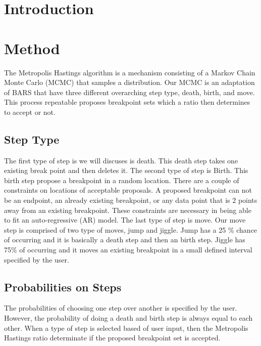 \documentclass[submit]{smj}
\begin{document}
\maketitle


\section{Introduction}

\section{Method}
The Metropolis Hastings algorithm is a mechanism consisting of a Markov Chain Monte Carlo (MCMC) that samples a distribution.  Our MCMC is an adaptation of BARS that have three different overarching step type, death, birth, and move. This process repeatable proposes breakpoint sets which a ratio then determines to accept or not. 

\subsection{Step Type}
The first type of step is we will discuses is death.  This death step takes one existing break point and then deletes it.  The second type of step is Birth. This birth step propose a breakpoint in a random location. There are a couple of constraints on locations of acceptable proposals. A proposed breakpoint can not be an endpoint, an already existing breakpoint, or any data point that is 2 points away from an existing breakpoint. These constraints are necessary in being able to fit an auto-regressive (AR) model. The last type of step is move. Our move step is comprised of two type of moves, jump and jiggle.  Jump has a 25 \% chance of occurring and it is basically a death step and then an birth step. Jiggle has 75\% of occurring and it moves an existing breakpoint in a small defined interval specified by the user. 

\subsection{Probabilities on Steps}
The probabilities of choosing one step over another is specified by the user. However, the probability of doing a death and birth step is always equal to each other.  When a type of step is selected based of user input, then the Metropolis Hastings ratio determinate if the proposed breakpoint set is accepted.  
\end{document}
